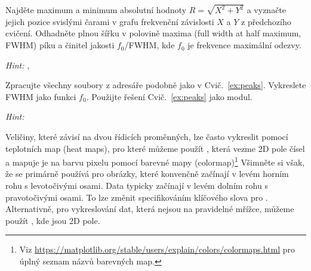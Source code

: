 \begin{exercise}
    \label{ex:peaks}
    Najděte maximum a minimum absolutní hodnoty $R = \sqrt{X^2 + Y^2}$ a vyznačte jejich pozice svislými čarami v grafu frekvenční závislosti $X$ a $Y$ z předchozího cvičení. Odhadněte plnou šířku v polovině maxima (full width at half maximum, FWHM) píku a činitel jakosti $f_0$/FWHM, kde $f_0$ je frekvence maximální odezvy. 
    
    \emph{Hint:} , 
\end{exercise}
\begin{exercise}
    \label{ex:peaks-all}
    Zpracujte všechny soubory z adresáře  podobně jako v Cvič.~\ref{ex:peaks}. Vykreslete FWHM jako funkci $f_0$. Použijte řešení Cvič.~\ref{ex:peaks} jako modul.
    
    \emph{Hint:} 
\end{exercise}

Veličiny, které závisí na dvou řídicích proměnných, lze často vykreslit pomocí teplotních map (heat maps), pro které můžeme použít , která vezme 2D pole čísel a mapuje je na barvu pixelu pomocí barevné mapy (colormap)\footnote{Viz \url{https://matplotlib.org/stable/users/explain/colors/colormaps.html} pro úplný seznam názvů barevných map.} Všimněte si však, že  se primárně používá pro obrázky, které konvenčně začínají v levém horním rohu s levotočivými osami. Data typicky začínají v levém dolním rohu s pravotočivými osami. To lze změnit specifikováním klíčového slova  pro . Alternativně, pro vykreslování dat, která nejsou na pravidelné mřížce, můžeme použít , kde  jsou 2D pole.


